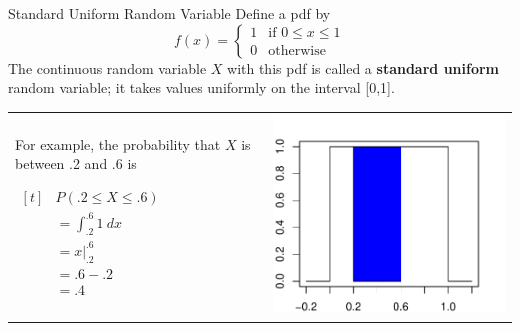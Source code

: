\documentclass[handout]{beamer}
\renewcommand{\emph}{\textbf}
\begin{document}
\begin{frame}{Standard Uniform Random Variable}
Define a pdf by
$$f(x)=\begin{cases}1 & \text{if }0\leq x\leq 1 \\
0 & \text{otherwise}\end{cases}$$
The continuous random variable $X$ with this pdf is called a \emph{standard uniform} random variable; it takes values uniformly on the interval [0,1].
\begin{tabular}{@{}p{5.5cm}p{4.5cm}}
\vspace{0cm}For example, the probability that $X$ is between .2 and .6 is
\begin{center}$\begin{aligned}[t]
&P(.2 \leq X \leq .6) \\
&=\int_{.2}^{.6} 1\ dx\\
&= x\vert_{.2}^{.6}\\
&= .6-.2\\
&=.4
\end{aligned}$\end{center}
&
\vspace{0cm}\includegraphics[scale=.6]{ch4_pdf_unif.pdf}
\end{tabular}
\end{frame}
\end{document}
